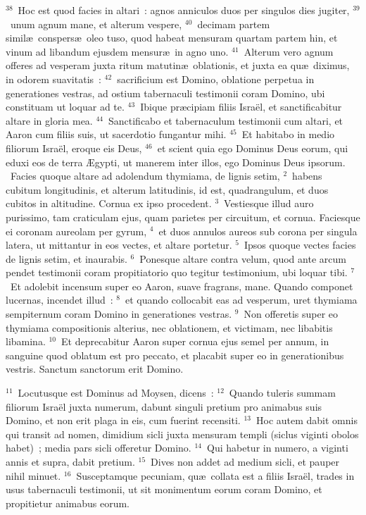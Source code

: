 ${}^{38}$~Hoc est quod facies in altari~: agnos anniculos duos per singulos dies jugiter,
${}^{39}$~unum agnum mane, et alterum vespere,
${}^{40}$~decimam partem simil\ae\ conspers\ae\ oleo tuso, quod habeat mensuram quartam partem hin, et vinum ad libandum ejusdem mensur\ae\ in agno uno.
${}^{41}$~Alterum vero agnum offeres ad vesperam juxta ritum matutin\ae\ oblationis, et juxta ea qu\ae\ diximus, in odorem suavitatis~:
${}^{42}$~sacrificium est Domino, oblatione perpetua in generationes vestras, ad ostium tabernaculi testimonii coram Domino, ubi constituam ut loquar ad te.
${}^{43}$~Ibique pr\ae cipiam filiis Isra\"el, et sanctificabitur altare in gloria mea.
${}^{44}$~Sanctificabo et tabernaculum testimonii cum altari, et Aaron cum filiis suis, ut sacerdotio fungantur mihi.
${}^{45}$~Et habitabo in medio filiorum Isra\"el, eroque eis Deus,
${}^{46}$~et scient quia ego Dominus Deus eorum, qui eduxi eos de terra \AE gypti, ut manerem inter illos, ego Dominus Deus ipsorum.
~Facies quoque altare ad adolendum thymiama, de lignis setim,
${}^{2}$~habens cubitum longitudinis, et alterum latitudinis, id est, quadrangulum, et duos cubitos in altitudine. Cornua ex ipso procedent.
${}^{3}$~Vestiesque illud auro purissimo, tam craticulam ejus, quam parietes per circuitum, et cornua. Faciesque ei coronam aureolam per gyrum,
${}^{4}$~et duos annulos aureos sub corona per singula latera, ut mittantur in eos vectes, et altare portetur.
${}^{5}$~Ipsos quoque vectes facies de lignis setim, et inaurabis.
${}^{6}$~Ponesque altare contra velum, quod ante arcum pendet testimonii coram propitiatorio quo tegitur testimonium, ubi loquar tibi.
${}^{7}$~Et adolebit incensum super eo Aaron, suave fragrans, mane. Quando componet lucernas, incendet illud~:
${}^{8}$~et quando collocabit eas ad vesperum, uret thymiama sempiternum coram Domino in generationes vestras.
${}^{9}$~Non offeretis super eo thymiama compositionis alterius, nec oblationem, et victimam, nec libabitis libamina.
${}^{10}$~Et deprecabitur Aaron super cornua ejus semel per annum, in sanguine quod oblatum est pro peccato, et placabit super eo in generationibus vestris. Sanctum sanctorum erit Domino.


${}^{11}$~Locutusque est Dominus ad Moysen, dicens~:
${}^{12}$~Quando tuleris summam filiorum Isra\"el juxta numerum, dabunt singuli pretium pro animabus suis Domino, et non erit plaga in eis, cum fuerint recensiti.
${}^{13}$~Hoc autem dabit omnis qui transit ad nomen, dimidium sicli juxta mensuram templi (siclus viginti obolos habet)~; media pars sicli offeretur Domino.
${}^{14}$~Qui habetur in numero, a viginti annis et supra, dabit pretium.
${}^{15}$~Dives non addet ad medium sicli, et pauper nihil minuet.
${}^{16}$~Susceptamque pecuniam, qu\ae\ collata est a filiis Isra\"el, trades in usus tabernaculi testimonii, ut sit monimentum eorum coram Domino, et propitietur animabus eorum.


